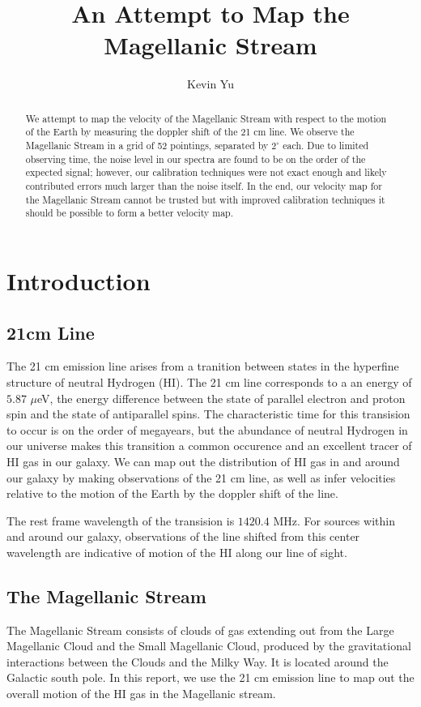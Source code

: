 \documentclass[12pt]{article}
\title{An Attempt to Map the Magellanic Stream}
\author {
Kevin Yu
}
\begin{document}
\maketitle
\nocite{Heiles}
\begin{abstract}
We attempt to map the velocity of the Magellanic Stream with respect to the motion of the Earth by measuring the doppler shift of the 21 cm line. We observe the Magellanic Stream in a grid of 52 pointings, separated by $2^\circ$ each. Due to limited observing time, the noise level in our spectra are found to be on the order of the expected signal; however, our calibration techniques were not exact enough and likely contributed errors much larger than the noise itself. In the end, our velocity map for the Magellanic Stream cannot be trusted but with improved calibration techniques it should be possible to form a better velocity map.
\end{abstract}

\section{Introduction}
\subsection*{21cm Line}
The 21 cm emission line arises from a tranition between states in the hyperfine structure of neutral Hydrogen (HI). The 21 cm line corresponds to a an energy of $5.87$ $\mu$eV, the energy difference between the state of parallel electron and proton spin and the state of antiparallel spins. The characteristic time for this transision to occur is on the order of megayears, but the abundance of neutral Hydrogen in our universe makes this transition a common occurence and an excellent tracer of HI gas in our galaxy. We can map out the distribution of HI gas in and around our galaxy by making observations of the 21 cm line, as well as infer velocities relative to the motion of the Earth by the doppler shift of the line.

The rest frame wavelength of the transision is $1420.4$ MHz. For sources within and around our galaxy, observations of the line shifted from this center wavelength are indicative of motion of the HI along our line of sight.

\subsection*{The Magellanic Stream}
The Magellanic Stream consists of clouds of gas extending out from the Large Magellanic Cloud and the Small Magellanic Cloud, produced by the gravitational interactions between the Clouds and the Milky Way. It is located around the Galactic south pole. In this report, we use the 21 cm emission line to map out the overall motion of the HI gas in the Magellanic stream.
\end{document}
